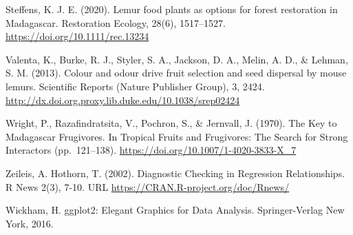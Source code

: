 \documentclass[
  12pt,
]{article}
\begin{document}
Steffens, K. J. E. (2020). Lemur food plants as options for forest
restoration in Madagascar. Restoration Ecology, 28(6), 1517--1527.
\url{https://doi.org/10.1111/rec.13234}

Valenta, K., Burke, R. J., Styler, S. A., Jackson, D. A., Melin, A. D.,
\& Lehman, S. M. (2013). Colour and odour drive fruit selection and seed
dispersal by mouse lemurs. Scientific Reports (Nature Publisher Group),
3, 2424. \url{http://dx.doi.org.proxy.lib.duke.edu/10.1038/srep02424}

Wright, P., Razafindratsita, V., Pochron, S., \& Jernvall, J. (1970).
The Key to Madagascar Frugivores. In Tropical Fruits and Frugivores: The
Search for Strong Interactors (pp.~121--138).
\url{https://doi.org/10.1007/1-4020-3833-X_7}

Zeileis, A. Hothorn, T. (2002). Diagnostic Checking in Regression
Relationships. R News 2(3), 7-10. URL
\url{https://CRAN.R-project.org/doc/Rnews/}

Wickham, H. ggplot2: Elegant Graphics for Data Analysis. Springer-Verlag
New York, 2016.
\end{document}
